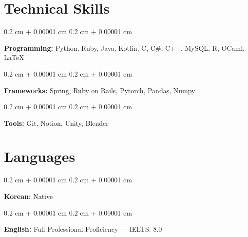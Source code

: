\documentclass[10pt, letterpaper]{article}
\newenvironment{onecolentry}{
    \begin{adjustwidth}{
        0.2 cm + 0.00001 cm
    }{
        0.2 cm + 0.00001 cm
    }
}{
    \end{adjustwidth}
} %
\begin{document}
    
    \section{Technical Skills}

        \begin{onecolentry}
            \textbf{Programming:} Python, Ruby, Java, Kotlin, C, C\#, C++, MySQL, R, OCaml, LaTeX
        \end{onecolentry}

        \vspace{0.2 cm}

        \begin{onecolentry}
            \textbf{Frameworks:} Spring, Ruby on Rails, Pytorch, Pandas, Numpy
        \end{onecolentry}

        \vspace{0.2 cm}

        \begin{onecolentry}
            \textbf{Tools:} Git, Notion, Unity, Blender
        \end{onecolentry}   


    \section{Languages}

        \begin{onecolentry}
            \textbf{Korean:} Native
        \end{onecolentry}

        \vspace{0.2 cm}

        \begin{onecolentry}
            \textbf{English:} Full Professional Proficiency --- IELTS: 8.0
        \end{onecolentry}
\end{document}
